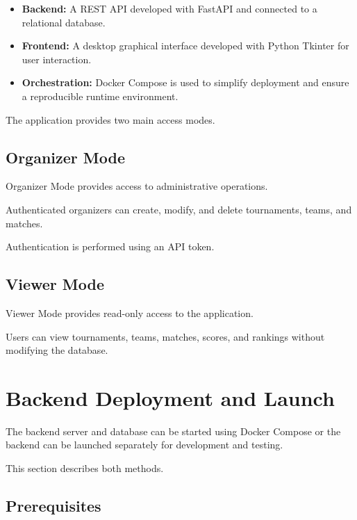 \documentclass[12pt,a4paper]{article}
\begin{document}
\begin{itemize}
\item \textbf{Backend:} A REST API developed with FastAPI
and connected to a relational database.

\item \textbf{Frontend:} A desktop graphical interface
developed with Python Tkinter for user interaction.

\item \textbf{Orchestration:} Docker Compose is used to
simplify deployment and ensure a reproducible runtime
environment.
\end{itemize}

The application provides two main access modes.

\subsection{Organizer Mode}

Organizer Mode provides access to administrative operations.

Authenticated organizers can create, modify, and delete
tournaments, teams, and matches.

Authentication is performed using an API token.

\subsection{Viewer Mode}

Viewer Mode provides read-only access to the application.

Users can view tournaments, teams, matches, scores, and
rankings without modifying the database.


\section{Backend Deployment and Launch}

The backend server and database can be started using Docker
Compose or the backend can be launched separately for
development and testing.

This section describes both methods.

\subsection{Prerequisites}
\end{document}
